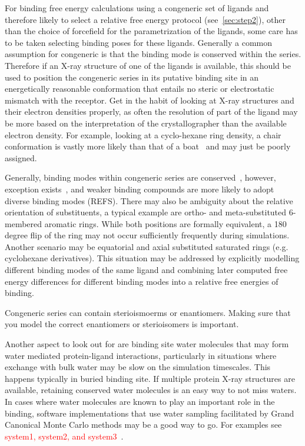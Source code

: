 \documentclass[9pt,bestpractices]{livecoms}
\begin{document}
For binding free energy calculations using a congeneric set of ligands and therefore likely to select a relative free energy protocol (see~\ref{sec:step2}), other than the choice of forcefield for the parametrization of the ligands, some care has to be taken selecting binding poses for these ligands. Generally a common assumption for congeneric is that the binding mode is conserved within the series. Therefore if an X-ray structure of one of the ligands is available, this should be used to position the congeneric series in its putative binding site in an energetically reasonable conformation that entails no steric or electrostatic mismatch with the receptor. Get in the habit of looking at X-ray structures and their electron densities properly, as often the resolution of part of the ligand may be more based on the interpretation of the crystallographer than the available electron density. For example, looking at a cyclo-hexane ring density, a chair conformation is vastly more likely than that of a boat~\cite{maybe we can find some reference here?} and may just be poorly assigned. 

Generally, binding modes within congeneric series are conserved~\cite{}, however, exception exists~\cite{}, and weaker binding compounds are more likely to adopt diverse binding modes (REFS). There may also be ambiguity about the relative orientation of substituents, a typical example are ortho- and meta-substituted 6-membered aromatic rings. While both positions are formally equivalent, a 180 degree flip of the ring may not occur sufficiently frequently during simulations. Another scenario may be equatorial and axial substituted saturated rings (e.g. cyclohexane derivatives). This situation may be addressed by explicitly modelling different binding modes of the same ligand and combining later computed free energy differences for different binding modes into a relative free energies of binding. 

Congeneric series can contain sterioismoerms or enantiomers. Making sure that you model the correct enantiomers or sterioisomers is important.

Another aspect to look out for are binding site water molecules that may form water mediated protein-ligand interactions, particularly in situations where exchange with bulk water may be slow on the simulation timescales. This happens typically in buried binding site. If multiple protein X-ray structures are available, retaining conserved water molecules is an easy way to not miss waters. In cases where water molecules are known to play an important role in the binding, software implementations that use water sampling facilitated by Grand Canonical Monte Carlo methods may be a good way to go. For examples see \textcolor{red}{system1, system2, and system3}~\cite{x,y,z}.
\end{document}
